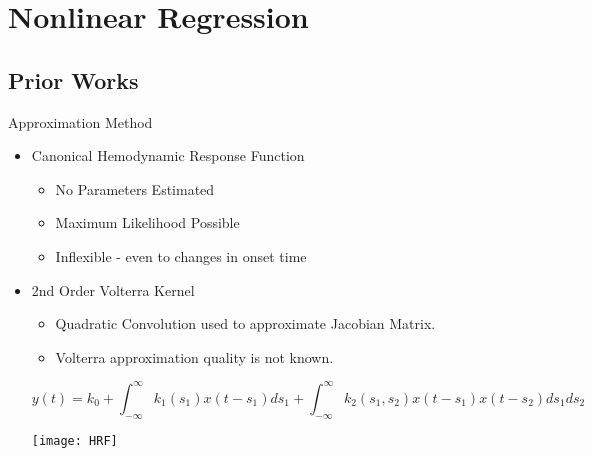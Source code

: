 \section{Nonlinear Regression}
\subsection{Prior Works}
\begin{frame}{Approximation Method}
  \begin{itemize}
    \item Canonical Hemodynamic Response Function
    \begin{itemize}
        \item No Parameters Estimated
        \item Maximum Likelihood Possible
        \item Inflexible - even to changes in onset time
    \end{itemize}
    \item 2nd Order Volterra Kernel \cite{Friston2000}
    \begin{itemize}
        \item Quadratic Convolution used to approximate Jacobian Matrix.
        \item Volterra approximation quality is not known.
    \end{itemize}
    {\footnotesize
    $$y(t) = k_0 + \int_{-\infty}^{\infty} k_1(s_1) x(t-s_1) ds_1
        + \int_{-\infty}^{\infty} k_2(s_1,s_2) x(t-s_1)x(t-s_2) ds_1 ds_2$$
    }
    \begin{center}
    \texttt{[image: HRF]}
    \end{center}
    
  \end{itemize}
\end{frame}

